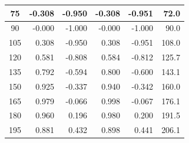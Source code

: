 \begin{table}[htbp]
\begin{center}
\begin{tabular}{|p{15 mm}|p{15 mm}|p{15 mm}|p{15 mm}|p{15 mm}|p{15 mm}|}
            \multicolumn{1}{|c|}{75}                   & \multicolumn{1}{|r|}{-0.308}                    & \multicolumn{1}{|r|}{-0.950}     & \multicolumn{1}{|r|}{-0.308}     & \multicolumn{1}{|r|}{-0.951}        & \multicolumn{1}{|r|}{72.0}      \\ \hline
            \multicolumn{1}{|c|}{90}                   & \multicolumn{1}{|r|}{-0.000}                    & \multicolumn{1}{|r|}{-1.000}     & \multicolumn{1}{|r|}{-0.000}     & \multicolumn{1}{|r|}{-1.000}        & \multicolumn{1}{|r|}{90.0}      \\ \hline
            \multicolumn{1}{|c|}{105}                  & \multicolumn{1}{|r|}{0.308}                     & \multicolumn{1}{|r|}{-0.950}     & \multicolumn{1}{|r|}{0.308}      & \multicolumn{1}{|r|}{-0.951}        & \multicolumn{1}{|r|}{108.0}      \\ \hline
            \multicolumn{1}{|c|}{120}                  & \multicolumn{1}{|r|}{0.581}                     & \multicolumn{1}{|r|}{-0.808}     & \multicolumn{1}{|r|}{0.584}      & \multicolumn{1}{|r|}{-0.812}        & \multicolumn{1}{|r|}{125.7}      \\ \hline
            \multicolumn{1}{|c|}{135}                  & \multicolumn{1}{|r|}{0.792}                     & \multicolumn{1}{|r|}{-0.594}     & \multicolumn{1}{|r|}{0.800}      & \multicolumn{1}{|r|}{-0.600}        & \multicolumn{1}{|r|}{143.1}      \\ \hline
            \multicolumn{1}{|c|}{150}                  & \multicolumn{1}{|r|}{0.925}                     & \multicolumn{1}{|r|}{-0.337}     & \multicolumn{1}{|r|}{0.940}      & \multicolumn{1}{|r|}{-0.342}        & \multicolumn{1}{|r|}{160.0}      \\ \hline
            \multicolumn{1}{|c|}{165}                  & \multicolumn{1}{|r|}{0.979}                     & \multicolumn{1}{|r|}{-0.066}     & \multicolumn{1}{|r|}{0.998}      & \multicolumn{1}{|r|}{-0.067}        & \multicolumn{1}{|r|}{176.1}      \\ \hline
            \multicolumn{1}{|c|}{180}                  & \multicolumn{1}{|r|}{0.960}                     & \multicolumn{1}{|r|}{0.196}      & \multicolumn{1}{|r|}{0.980}      & \multicolumn{1}{|r|}{0.200}         & \multicolumn{1}{|r|}{191.5}      \\ \hline
            \multicolumn{1}{|c|}{195}                  & \multicolumn{1}{|r|}{0.881}                     & \multicolumn{1}{|r|}{0.432}      & \multicolumn{1}{|r|}{0.898}      & \multicolumn{1}{|r|}{0.441}         & \multicolumn{1}{|r|}{206.1}      \\ \hline

\end{tabular}
\end{center}
\end{table}
